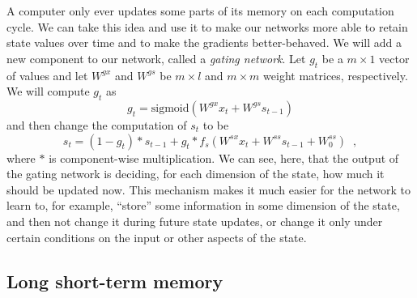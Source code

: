 A computer only ever updates some parts of its memory on each
computation cycle.  We can take this idea and use it to make our
networks more able to retain state values over time and to make the
gradients better-behaved.  We will add a new component to our network,
called a {\em gating network}.  Let $g_t$ be a $m \times 1$ vector of
values and let $W^{gx}$ and $W^{gs}$ be $m \times l$ and $m \times m$
weight matrices, respectively.  We will compute $g_t$ as
\begin{equation}
  g_t = \text{sigmoid}(W^{gx} x_t + W^{gs} s_{t-1})
\end{equation}
and then change the computation of $s_t$ to be
\begin{equation}
  s_t = (1 - g_t) *  s_{t-1} + g_t * f_s(W^{sx}x_t + W^{ss}
  s_{t-1} + W^{ss}_0)\;\;,
\end{equation}
where $*$ is component-wise multiplication.  We can see, here, that
the output of the gating network is deciding, for each dimension of
the state, how much it should be updated now.  This mechanism makes it
much easier for the network to learn to,  for example, ``store'' some
information in some dimension of the state, and then not change it
during future state updates, or change it only under certain
conditions on the input or other aspects of the state.

\subsection{Long short-term memory}

